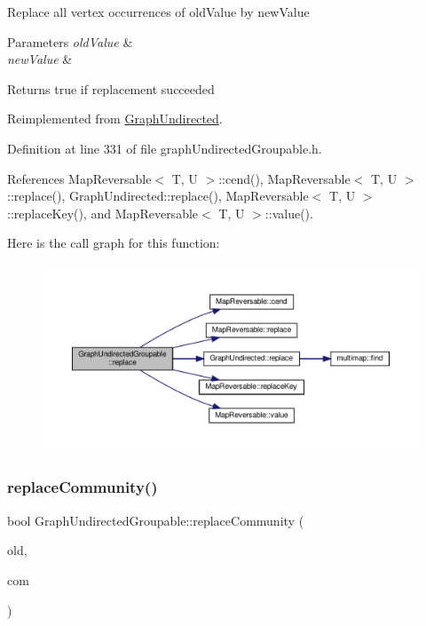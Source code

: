 Replace all vertex occurrences of old\+Value by new\+Value


\begin{DoxyParams}{Parameters}
{\em old\+Value} & \\
\hline
{\em new\+Value} & \\
\hline
\end{DoxyParams}
\begin{DoxyReturn}{Returns}
true if replacement succeeded 
\end{DoxyReturn}


Reimplemented from \hyperlink{classGraphUndirected_aee3bc279ffe39f8efb7dd60865279474}{Graph\+Undirected}.



Definition at line 331 of file graph\+Undirected\+Groupable.\+h.



References Map\+Reversable$<$ T, U $>$\+::cend(), Map\+Reversable$<$ T, U $>$\+::replace(), Graph\+Undirected\+::replace(), Map\+Reversable$<$ T, U $>$\+::replace\+Key(), and Map\+Reversable$<$ T, U $>$\+::value().

Here is the call graph for this function\+:
\nopagebreak
\begin{figure}[H]
\begin{center}
\leavevmode
\includegraphics[width=350pt]{classGraphUndirectedGroupable_a164600ca9727676ad7b370b9061927d4_cgraph}
\end{center}
\end{figure}
\mbox{\label{classGraphUndirectedGroupable_af29e653d9578b955e47288e075ebf47f}} 
\subsubsection{\texorpdfstring{replace\+Community()}{replaceCommunity()}}
{\footnotesize\ttfamily bool Graph\+Undirected\+Groupable\+::replace\+Community (\begin{DoxyParamCaption}\item[{const \hyperlink{graphUndirectedGroupable_8h_a914da95c9ea7f14f4b7f875c36818556}{type\+Community} \&}]{old,  }\item[{const \hyperlink{graphUndirectedGroupable_8h_a914da95c9ea7f14f4b7f875c36818556}{type\+Community} \&}]{com }\end{DoxyParamCaption})\hspace{0.3cm}{\ttfamily [inline]}}

